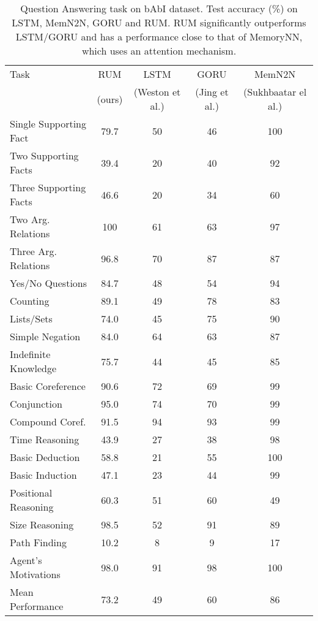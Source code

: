 \documentclass{article} \usepackage{iclr2018_conference,times}
\begin{document}
\begin{table*}[!htb]
\centering
\begin{tabular}{lcccc}
\hline
Task       & RUM  & LSTM & GORU  &  MemN2N   \\ 
 & (ours) &  (Weston et al.)& (Jing et al.)  & (Sukhbaatar el al.) \\
\hline
Single Supporting Fact	&   79.7&   50       &   46 &   100      \\
Two Supporting Facts	&	39.4&   20	    &	40  &   92       \\
Three Supporting Facts	&   46.6&   20      &	34  &   60       \\
Two Arg. Relations	    & 	100&	61      &	63   &   97     	\\
Three Arg. Relations    &   96.8&   70     &	87    &   87      \\
Yes/No Questions	    &   84.7&   48     &	54   &   94       \\
Counting	            &   89.1&   49    &   78    &   83       \\
Lists/Sets	            &   74.0&   45    &   75   &   90        \\
Simple Negation	        &   84.0&   64     &   63   &   87       \\
Indefinite Knowledge    &   75.7&   44  &   45     &   85        \\
Basic Coreference	    &   90.6&   72      &   69    &   99     \\
Conjunction	            &   95.0&   74   &	70     &   99       \\
Compound Coref.	        &   91.5&   94   &	93     &   99      	\\
Time Reasoning	        &   43.9&   27   &	38     &   98       \\
Basic Deduction	        &   58.8&   21  &	55      &	100      \\
Basic Induction	        &   47.1&   23   &	44     &   99      	\\
Positional Reasoning	&   60.3&   51 	&	60      &	49   	\\
Size Reasoning	        &   98.5&   52    &	91   &	89  	 	\\
Path Finding	        &   10.2&   8     &	9   &	17		  	\\
Agent's Motivations     &   98.0&   91    &	98   &   100       \\
\hline
Mean Performance	    &   73.2&   49      &	60&	86	       \\
\hline
\end{tabular}
\caption{Question Answering task on bAbI dataset. Test accuracy (\%) on LSTM, MemN2N, GORU and RUM. RUM significantly outperforms LSTM/GORU and has a performance close to that of MemoryNN, which uses an attention mechanism.}
\end{table*}
\end{document}
